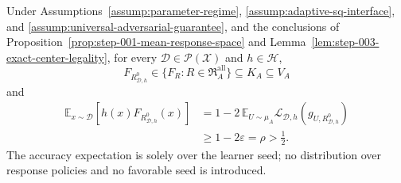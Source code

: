 \begin{proposition}
\label{prop:step-003-exact-correlation}
Under Assumptions~\ref{assump:parameter-regime},
\ref{assump:adaptive-sq-interface}, and
\ref{assump:universal-adversarial-guarantee}, and the conclusions of
Proposition~\ref{prop:step-001-mean-response-space} and
Lemma~\ref{lem:step-003-exact-center-legality}, for every
\(\mathcal D\in\mathcal P(\mathcal X)\) and \(h\in\mathcal H\),
\[
F_{R^0_{\mathcal D,h}}
\in\{F_R:R\in\mathfrak R_A^{\mathrm{all}}\}
\subseteq K_A\subseteq V_A
\]
and
\[
\begin{aligned}
\mathbb E_{x\sim\mathcal D}[h(x)F_{R^0_{\mathcal D,h}}(x)]
&=1-2\,\mathbb E_{U\sim\mu_A}
\mathcal L_{\mathcal D,h}(g_{U,R^0_{\mathcal D,h}})\\
&\ge1-2\varepsilon=\rho>\frac12.
\end{aligned}
\]
The accuracy expectation is solely over the learner seed; no distribution
over response policies and no favorable seed is introduced.
\end{proposition}

